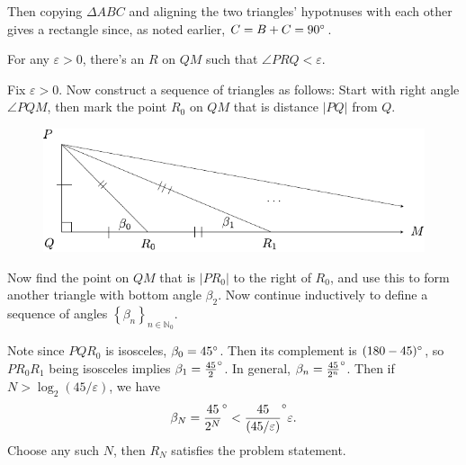 \documentclass[twoside,10pt]{article}
\begin{document}
Then copying $\Delta ABC$ and aligning the two triangles' hypotnuses with each other gives a rectangle since, as noted earlier, $C=B+C=90^\circ$.

\newpage

\begin{exer}[6.16]
For any $\varepsilon> 0$, there's an $R$ on $QM$ such that $\angle PRQ < \varepsilon$.
\end{exer}

Fix $\varepsilon>0$. Now construct a sequence of triangles as follows: Start with right angle $\angle PQM$, then mark the point $R_0$ on $QM$ that is distance $|PQ|$ from $Q$.

\begin{figure}[H]
	\centering
	\includegraphics[scale=1]{fig/16.pdf}
\end{figure}

Now find the point on $QM$ that is $|PR_0|$ to the right of $R_0$, and use this to form another triangle with bottom angle $\beta_2$. Now continue inductively to define a sequence of angles $\left\{ \beta_n \right\}_{n \in \mathbb{N}_{0}}$.

Note since $PQR_0$ is isosceles, $\beta_0 =45^\circ$. Then its complement is $(180-45)^\circ$, so $PR_0R_1$ being isosceles implies $\beta_1 = \frac{45}{2}^\circ$. In general, $\beta_{n} = \frac{45}{2^{n}}^\circ$. Then if $N > \log_2(45/\varepsilon)$, we have
\[
	\beta_N = \frac{45}{2^{N}}^\circ < \frac{45}{(45/\varepsilon)} ^\circ \varepsilon.
\] Choose any such $N$, then $R_{N}$ satisfies the problem statement.

\newpage
\end{document}
